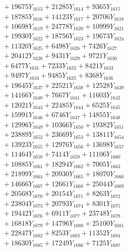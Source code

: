 \documentclass[a4paper,10pt]{article}
\begin{document}
{\begin{align}
&\;  + 19675 Y_{1613} + 21285 Y_{1614} + 9365 Y_{1615} \\[0.3ex]
&\;  + 18785 Y_{1616} + 14123 Y_{1617} + 20706 Y_{1618} \\[0.5ex]\allowbreak
&\;  + 10698 Y_{1619} + 24778 Y_{1620} + 10999 Y_{1621} \\[0.3ex]
&\;  + 19930 Y_{1622} + 18756 Y_{1623} + 19673 Y_{1624} \\[0.3ex]
&\;  + 11320 Y_{1625} + 6498 Y_{1626} + 7426 Y_{1627} \\[0.3ex]
&\;  + 20412 Y_{1628} + 9431 Y_{1629} + 9721 Y_{1630} \\[0.3ex]
&\;  + 6477 Y_{1631} + 7233 Y_{1632} + 8421 Y_{1633} \\[0.3ex]
&\;  + 9497 Y_{1634} + 9485 Y_{1635} + 8368 Y_{1636} \\[0.3ex]
&\;  + 19645 Y_{1637} + 22521 Y_{1638} + 12528 Y_{1639} \\[0.3ex]
&\;  + 14166 Y_{1640} + 7667 Y_{1641} + 11603 Y_{1642} \\[0.3ex]
&\;  + 12021 Y_{1643} + 22485 Y_{1644} + 6525 Y_{1645} \\[0.3ex]
&\;  + 15991 Y_{1646} + 6746 Y_{1647} + 14855 Y_{1648} \\[0.5ex]\allowbreak
&\;  + 12996 Y_{1649} + 10366 Y_{1650} + 19382 Y_{1651} \\[0.3ex]
&\;  + 23889 Y_{1652} + 23669 Y_{1653} + 13811 Y_{1654} \\[0.3ex]
&\;  + 13923 Y_{1655} + 12976 Y_{1656} + 13698 Y_{1657} \\[0.3ex]
&\;  + 11464 Y_{1658} + 7414 Y_{1659} + 11106 Y_{1660} \\[0.3ex]
&\;  + 10885 Y_{1661} + 18294 Y_{1662} + 7005 Y_{1663} \\[0.3ex]
&\;  + 21899 Y_{1664} + 20930 Y_{1665} + 18070 Y_{1666} \\[0.3ex]
&\;  + 14666 Y_{1667} + 12661 Y_{1668} + 25044 Y_{1669} \\[0.3ex]
&\;  + 20568 Y_{1670} + 20154 Y_{1671} + 8263 Y_{1672} \\[0.3ex]
&\;  + 23804 Y_{1673} + 20793 Y_{1674} + 8301 Y_{1675} \\[0.3ex]
&\;  + 19442 Y_{1676} + 6911 Y_{1677} + 23748 Y_{1678} \\[0.5ex]\allowbreak
&\;  + 16818 Y_{1679} + 14796 Y_{1680} + 25100 Y_{1681} \\[0.3ex]
&\;  + 22847 Y_{1682} + 8253 Y_{1683} + 11352 Y_{1684} \\[0.3ex]
&\;  + 18630 Y_{1685} + 17249 Y_{1686} + 7125 Y_{1687} \\[0.3ex]

\end{align}}
\end{document}
